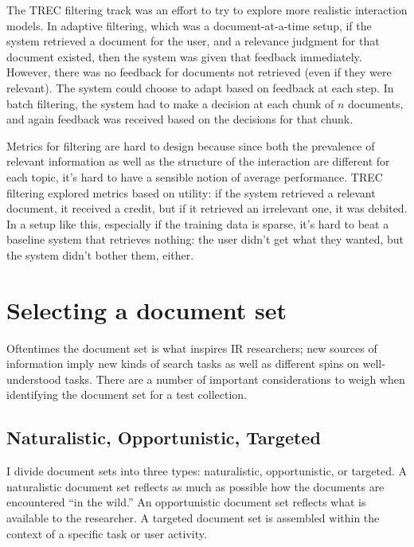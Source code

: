\documentclass[nobib]{tufte-book}
\begin{document}
The TREC filtering track was an effort to try to explore more realistic interaction models.  In adaptive filtering, which was a document-at-a-time setup, if the system retrieved a document for the user, and a relevance judgment for that document existed, then the system was given that feedback immediately.  However, there was no feedback for documents not retrieved (even if they were relevant).  The system could choose to adapt based on feedback at each step.  In batch filtering, the system had to make a decision at each chunk of $n$ documents, and again feedback was received based on the decisions for that chunk.

Metrics for filtering are hard to design because since both the prevalence of relevant information as well as the structure of the interaction are different for each topic, it's hard to have a sensible notion of average performance.  TREC filtering explored metrics based on utility: if the system retrieved a relevant document, it received a credit, but if it retrieved an irrelevant one, it was debited.  In a setup like this, especially if the training data is sparse, it's hard to beat a baseline system that retrieves nothing: the user didn't get what they wanted, but the system didn't bother them, either.

\chapter{Selecting a document set}

Oftentimes the document set is what inspires IR researchers; new sources of information imply new kinds of search tasks as well as different spins on well-understood tasks.  There are a number of important considerations to weigh when identifying the document set for a test collection.

\section{Naturalistic, Opportunistic, Targeted}

I divide document sets into three types: naturalistic, opportunistic, or targeted.  A naturalistic document set reflects as much as possible how the documents are encountered ``in the wild.''  An opportunistic document set reflects what is available to the researcher.  A targeted document set is assembled within the context of a specific task or user activity.
\end{document}
